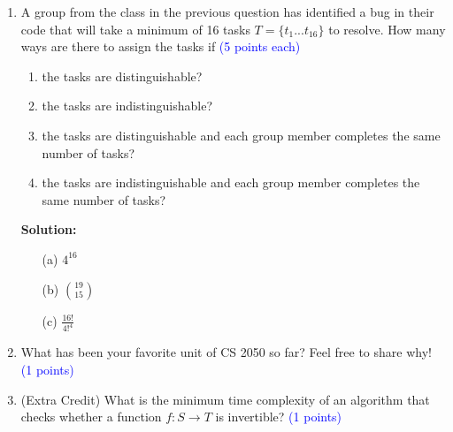 \documentclass{article}
\newcommand{\pt}[1]{\textcolor{blue}{(#1 points)}}
\newcommand{\pte}[1]{\textcolor{blue}{(#1 points each)}}
\newenvironment{solution}
{
\par
\color{blue}
\textbf{Solution:}
}
{
\par
}
\begin{document}
\begin{enumerate}
\item A group from the class in the previous question has identified a bug in their code that will take a minimum of 16 tasks $T = \{t_1...t_{16}\}$ to resolve. How many ways are there to assign the tasks if \pte{5}
\begin{enumerate}
    \item the tasks are distinguishable?
    \item the tasks are indistinguishable?
    \item the tasks are distinguishable and each group member completes the same number of tasks?
    \item the tasks are indistinguishable and each group member completes the same number of tasks?
\end{enumerate}

\begin{solution}
\begin{enumerate}
    \item[(a)] $4^16$
    \item[(b)] ${19 \choose 15}$
    \item[(c)] $\frac{16!}{4!^4}$
\end{enumerate}
\end{solution}
\item What has been your favorite unit of CS 2050 so far? Feel free to share why! \pt{1}

\item (Extra Credit) What is the minimum time complexity of an algorithm that checks whether a function $f:S \rightarrow T$ is invertible? \pt{1}

\end{enumerate}
\end{document}
